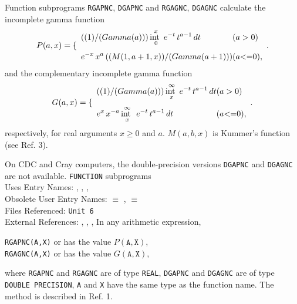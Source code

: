                           
                   
\Submitter{}                 
                     
Function subprograms {\tt RGAPNC}, {\tt DGAPNC} and
{\tt RGAGNC}, {\tt DGAGNC} calculate
the incomplete gamma function
$$P(a,x) =\left\{\begin{array}{l@{\qquad}l}
\displaystyle \frac{1}{\Gamma(a)} \int_0^x e^{-t}\,t^{a-1}\,dt &
(a > 0) \\[4mm]
\displaystyle e^{-x}\,x^a \, \frac{M(1,a + 1,x)}{\Gamma(a + 1)} &
(a \le 0), \end{array}\right.$$
and the complementary incomplete gamma function
$$G(a,x) =\left\{\begin{array}{l@{\qquad}l}
\displaystyle \frac{1}{\Gamma(a)} \int_x^\infty e^{-t}\,t^{a-1}\,dt &
(a > 0) \\[4mm]
\displaystyle e^x\,x^{-a} \int_x^\infty\,e^{-t}\,t^{a-1}\,dt &
(a \le 0), \end{array}\right.$$
respectively, for real arguments $x \ge 0$ and $a$.
$M(a,b,x)$ is Kummer's function (see Ref. 3).
\par
On CDC and Cray computers, the double-precision versions
{\tt DGAPNC} and {\tt DGAGNC} are not available.
\Structure
{\tt FUNCTION} subprograms \\
Uses Entry Names:
, , ,  \\
Obsolete User Entry Names:  $\equiv$ ,
                            $\equiv$  \\
Files Referenced: {\tt Unit 6} \\
External References: , ,
, 
\Usage
In any arithmetic expression,
\begin{center}
{\tt RGAPNC(A,X)} \quad or 
\quad has the value \quad $P(\mathtt{A,X})$, \\
{\tt RGAGNC(A,X)} \quad or 
\quad has the value \quad $G(\mathtt{A,X})$,
\end{center}
where {\tt RGAPNC} and {\tt RGAGNC} are of type {\tt REAL},
{\tt DGAPNC} and {\tt DGAGNC} are of type {\tt DOUBLE PRECISION},
{\tt A} and {\tt X} have the same type as the function name.
\Method
The method is described in Ref. 1.
\Accuracy
